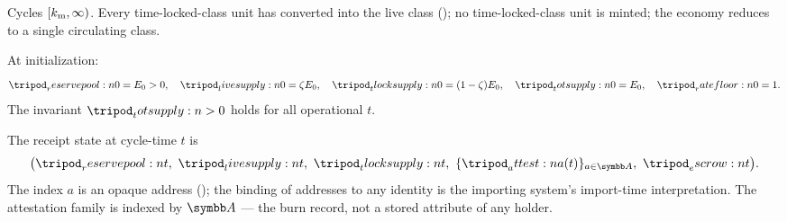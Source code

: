 \documentclass[../main.tex]{subfiles}
\begin{document}
\begin{definition}
    \label{def:model:normal-phase}
    Cycles $[k\sb{\mathrm{m}}, \infty)$. Every time-locked-class unit has converted into the live
    class (); no time-locked-class unit is minted; the
    economy reduces to a single circulating class.
\end{definition}

\begin{postulate}[Genesis]
    \label{postc:model:genesis}
    At initialization:
    \[
        \reservepool{0} = \genesisreserve > 0, \quad
        \livesupply{0} = \livesplit\genesisreserve, \quad
        \tlocksupply{0} = (1-\livesplit)\genesisreserve, \quad
        \totsupply{0} = \genesisreserve, \quad
        \ratefloor{0} = 1.
    \]
    The invariant $\totsupply{} > 0$ holds for all operational $t$.
\end{postulate}

\begin{remark}
    \label{rem:model:state}
    The receipt state at cycle-time $t$ is
    \[
        \bigl(\reservepool{t},\ \livesupply{t},\ \tlocksupply{t},\
              \set{\attest{a}(t)}_{a \in \addrspace},\ \escrow{t}\bigr).
    \]
    The index $a$ is an opaque address (); the binding of
    addresses to any identity is the importing system's import-time interpretation. The
    attestation family is indexed by $\addrspace$ --- the burn record, not a stored
    attribute of any holder.
\end{remark}

\end{document}
